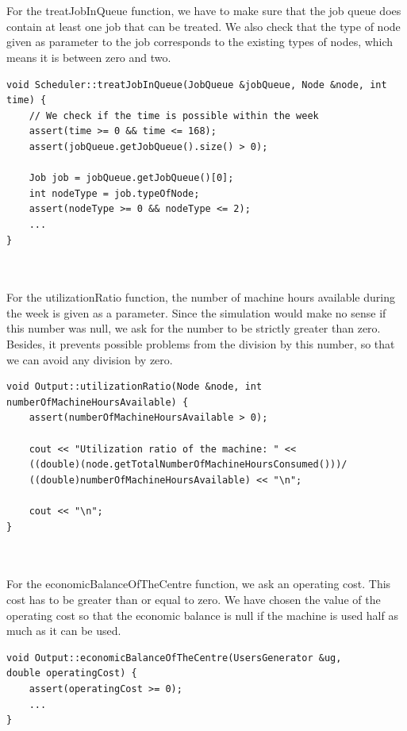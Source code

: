 \documentclass [10 pt, a4 paper]{report}
\begin{document}
\noindent
\\ \\
For the treatJobInQueue function, we have to make sure that the job queue does contain at least one job that can be treated. We also check that the type of node given as parameter to the job corresponds to the existing types of nodes, which means it is between zero and two.


\begin{lstlisting}[caption=treatJobInQueue function of the class Scheduler, label={lst:code1}, frame=single]
void Scheduler::treatJobInQueue(JobQueue &jobQueue, Node &node, int time) {
	// We check if the time is possible within the week
	assert(time >= 0 && time <= 168);
	assert(jobQueue.getJobQueue().size() > 0);

	Job job = jobQueue.getJobQueue()[0];
	int nodeType = job.typeOfNode;
	assert(nodeType >= 0 && nodeType <= 2);
	...
}
\end{lstlisting}

\noindent
\\ \\
For the utilizationRatio function, the number of machine hours available during the week is given as a parameter. Since the simulation would make no sense if this number was null, we ask for the number to be strictly greater than zero. Besides, it prevents possible problems from the division by this number, so that we can avoid any division by zero.

\clearpage
\begin{lstlisting}[caption=utilizationRatio function of the class Output, label={lst:code1}, frame=single]
void Output::utilizationRatio(Node &node, int numberOfMachineHoursAvailable) {
	assert(numberOfMachineHoursAvailable > 0);

	cout << "Utilization ratio of the machine: " <<
	((double)(node.getTotalNumberOfMachineHoursConsumed()))/
	((double)numberOfMachineHoursAvailable) << "\n";

	cout << "\n";
}
\end{lstlisting}


\noindent
\\ \\
For the economicBalanceOfTheCentre function, we ask an operating cost. This cost has to be greater than or equal to zero. We have chosen the value of the operating cost so that the economic balance is null if the machine is used half as much as it can be used.


\begin{lstlisting}[caption=economicBalanceOfTheCentre function of the class Output, label={lst:code1}, frame=single]
void Output::economicBalanceOfTheCentre(UsersGenerator &ug, 
double operatingCost) {
	assert(operatingCost >= 0);
	...
}
\end{lstlisting}
\end{document}
